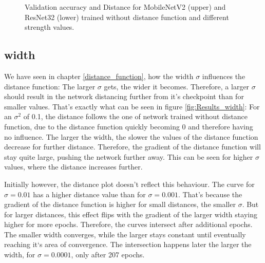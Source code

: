 \begin{figure}[h]
\begin{center}
        \caption{Validation accuracy and Distance for MobileNetV2 (upper) and ResNet32 (lower) trained without distance function and different strength values.}
    \end{center}
\end{figure}

\subsection{width}
We have seen in chapter \ref{distance_function}, how the width $\sigma$
influences the distance function: The larger $\sigma$ gets, the wider it
becomes. Therefore, a larger $\sigma$ should result in the network distancing
further from it's checkpoint than for smaller values. That's exactly what can be
seen in figure \ref{fig:Results_width}: For an $\sigma^2$ of 0.1, the distance
follows the one of network trained without distance function, due to the
distance function quickly becoming 0 and therefore having no influence. The
larger the width, the slower the values of the distance function decrease for further
distance. Therefore, the gradient of the distance function will stay quite
large, pushing the network further away. This can be seen for higher $\sigma$
values, where the distance increases further.


Initially however, the distance plot doesn't reflect this behaviour. The curve
for $\sigma = 0.01$ has a higher distance value than for $\sigma = 0.001$.
That's because the gradient of the distance function is higher for small distances, the
smaller $\sigma$. But for larger distances, this effect flips with the gradient
of the larger width staying higher for more epochs. Therefore, the curves
intersect after additional epochs. The smaller width converges, while the larger
stays constant until eventually reaching it`s area of convergence. The
intersection happens later the larger the width, for $\sigma = 0.0001$, only
after 207 epochs.

